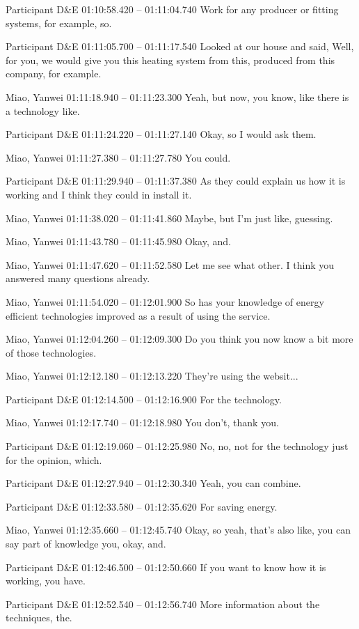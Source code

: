 {Participant D\&E 01:10:58.420 -- 01:11:04.740
Work for any producer or fitting systems, for example, so.

Participant D\&E 01:11:05.700 -- 01:11:17.540
Looked at our house and said, Well, for you, we would give you this heating system from this, produced from this company, for example.

Miao, Yanwei 01:11:18.940 -- 01:11:23.300
Yeah, but now, you know, like there is a technology like.

Participant D\&E 01:11:24.220 -- 01:11:27.140
Okay, so I would ask them.

Miao, Yanwei 01:11:27.380 -- 01:11:27.780
You could.

Participant D\&E 01:11:29.940 -- 01:11:37.380
As they could explain us how it is working and I think they could in install it.

Miao, Yanwei 01:11:38.020 -- 01:11:41.860
Maybe, but I'm just like, guessing.

Miao, Yanwei 01:11:43.780 -- 01:11:45.980
Okay, and.

Miao, Yanwei 01:11:47.620 -- 01:11:52.580
Let me see what other. I think you answered many questions already.

Miao, Yanwei 01:11:54.020 -- 01:12:01.900
So has your knowledge of energy efficient technologies improved as a result of using the service.

Miao, Yanwei 01:12:04.260 -- 01:12:09.300
Do you think you now know a bit more of those technologies.

Miao, Yanwei 01:12:12.180 -- 01:12:13.220
They're using the websit...

Participant D\&E 01:12:14.500 -- 01:12:16.900
For the technology.

Miao, Yanwei 01:12:17.740 -- 01:12:18.980
You don't, thank you.

Participant D\&E 01:12:19.060 -- 01:12:25.980
No, no, not for the technology just for the opinion, which.

Participant D\&E 01:12:27.940 -- 01:12:30.340
Yeah, you can combine.

Participant D\&E 01:12:33.580 -- 01:12:35.620
For saving energy.

Miao, Yanwei 01:12:35.660 -- 01:12:45.740
Okay, so yeah, that's also like, you can say part of knowledge you, okay, and.

Participant D\&E 01:12:46.500 -- 01:12:50.660
If you want to know how it is working, you have.

Participant D\&E 01:12:52.540 -- 01:12:56.740
More information about the techniques, the.

}
